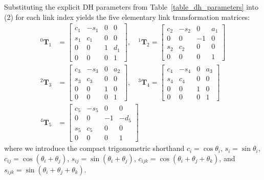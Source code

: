 \documentclass[journal]{IEEEtran}
\begin{document}
Substituting the explicit DH parameters from Table~\ref{table_dh_parameters} into (2) for each link index yields the five elementary link transformation matrices:
{\setlength{\arraycolsep}{2pt}
\begin{align}
{}^0\mathbf{T}_1 &= \begin{bmatrix}
c_1 & -s_1 & 0 & 0 \\
s_1 & c_1 & 0 & 0 \\
0 & 0 & 1 & d_1 \\
0 & 0 & 0 & 1
\end{bmatrix}, \quad
{}^1\mathbf{T}_2 = \begin{bmatrix}
c_2 & -s_2 & 0 & a_1 \\
0 & 0 & -1 & 0 \\
s_2 & c_2 & 0 & 0 \\
0 & 0 & 0 & 1
\end{bmatrix} \\
{}^2\mathbf{T}_3 &= \begin{bmatrix}
c_3 & -s_3 & 0 & a_2 \\
s_3 & c_3 & 0 & 0 \\
0 & 0 & 1 & 0 \\
0 & 0 & 0 & 1
\end{bmatrix}, \quad
{}^3\mathbf{T}_4 = \begin{bmatrix}
c_4 & -s_4 & 0 & a_3 \\
s_4 & c_4 & 0 & 0 \\
0 & 0 & 1 & 0 \\
0 & 0 & 0 & 1
\end{bmatrix} \\
{}^4\mathbf{T}_5 &= \begin{bmatrix}
c_5 & -s_5 & 0 & 0 \\
0 & 0 & -1 & -d_5 \\
s_5 & c_5 & 0 & 0 \\
0 & 0 & 0 & 1
\end{bmatrix}
\end{align}
}
where we introduce the compact trigonometric shorthand $c_i = \cos\theta_i$, $s_i = \sin\theta_i$, $c_{ij} = \cos(\theta_i + \theta_j)$, $s_{ij} = \sin(\theta_i + \theta_j)$, $c_{ijk} = \cos(\theta_i + \theta_j + \theta_k)$, and $s_{ijk} = \sin(\theta_i + \theta_j + \theta_k)$.
\end{document}

